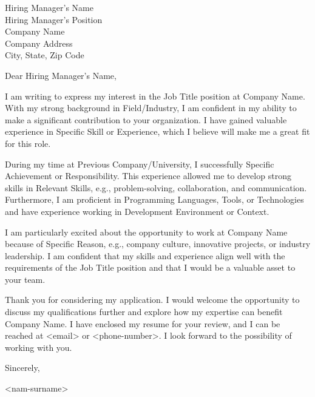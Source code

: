 \documentclass[a4paper,12pt]{article} %
\begin{document}
\vspace{12pt}
\vspace{12pt}

\begin{center}
    Hiring Manager's Name\\
    Hiring Manager's Position\\
    Company Name\\
    Company Address\\
    City, State, Zip Code
\end{center}

\vspace{12pt}
\vspace{12pt}

\begin{center}
    Dear Hiring Manager's Name,
\end{center}

\vspace{12pt}
\vspace{12pt}

I am writing to express my interest in the Job Title position at Company Name. With my strong background in Field/Industry, I am confident in my ability to make a significant contribution to your organization. I have gained valuable experience in Specific Skill or Experience, which I believe will make me a great fit for this role.

During my time at Previous Company/University, I successfully Specific Achievement or Responsibility. This experience allowed me to develop strong skills in Relevant Skills, e.g., problem-solving, collaboration, and communication. Furthermore, I am proficient in Programming Languages, Tools, or Technologies and have experience working in Development Environment or Context.

I am particularly excited about the opportunity to work at Company Name because of Specific Reason, e.g., company culture, innovative projects, or industry leadership. I am confident that my skills and experience align well with the requirements of the Job Title position and that I would be a valuable asset to your team.

Thank you for considering my application. I would welcome the opportunity to discuss my qualifications further and explore how my expertise can benefit Company Name. I have enclosed my resume for your review, and I can be reached at <email> or <phone-number>. I look forward to the possibility of working with you.

\vspace{12pt}

Sincerely,

<nam-surname>
\end{document}
